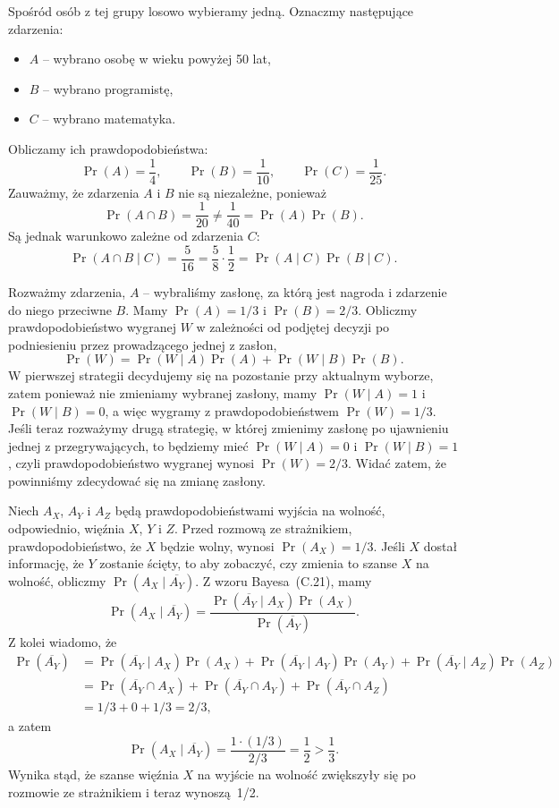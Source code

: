 Spośród osób z tej grupy losowo wybieramy jedną. Oznaczmy następujące zdarzenia:
\begin{itemize}
	\item $A$ -- wybrano osobę w wieku powyżej 50 lat,
	\item $B$ -- wybrano programistę,
	\item $C$ -- wybrano matematyka.
\end{itemize}
Obliczamy ich prawdopodobieństwa:
\[
	\Pr(A) = \frac{1}{4}, \qquad \Pr(B) = \frac{1}{10}, \qquad \Pr(C) = \frac{1}{25}.
\]
Zauważmy, że zdarzenia $A$ i $B$ nie są niezależne, ponieważ
\[
	\Pr(A\cap B) = \frac{1}{20} \ne \frac{1}{40} = \Pr(A)\Pr(B).
\]
Są jednak warunkowo zależne od zdarzenia $C$:
\[
	\Pr(A\cap B\mid C) = \frac{5}{16} = \frac{5}{8}\cdot\frac{1}{2} = \Pr(A\mid C)\Pr(B\mid C).
\]

\exercise{} %
Rozważmy zdarzenia, $A$ -- wybraliśmy zasłonę, za którą jest nagroda i zdarzenie do niego przeciwne $B$. Mamy $\Pr(A)=1/3$ i $\Pr(B)=2/3$. Obliczmy prawdopodobieństwo wygranej $W$ w zależności od podjętej decyzji po podniesieniu przez prowadzącego jednej z zasłon,
\[
	\Pr(W) = \Pr(W\mid A)\Pr(A)+\Pr(W\mid B)\Pr(B).
\]
W pierwszej strategii decydujemy się na pozostanie przy aktualnym wyborze, zatem ponieważ nie zmieniamy wybranej zasłony, mamy $\Pr(W\mid A)=1$ i~$\Pr(W\mid B)=0$, a więc wygramy z prawdopodobieństwem $\Pr(W)=1/3$. Jeśli teraz rozważymy drugą strategię, w której zmienimy zasłonę po ujawnieniu jednej z przegrywających, to będziemy mieć $\Pr(W\mid A)=0$ i $\Pr(W\mid B)=1$, czyli prawdopodobieństwo wygranej wynosi $\Pr(W)=2/3$. Widać zatem, że powinniśmy zdecydować się na zmianę zasłony.

\exercise{} %
Niech $A_X$, $A_Y$ i $A_Z$ będą prawdopodobieństwami wyjścia na wolność, odpowiednio, więźnia $X$, $Y$ i $Z$. Przed rozmową ze strażnikiem, prawdopodobieństwo, że $X$ będzie wolny, wynosi $\Pr(A_X)=1/3$. Jeśli $X$ dostał informację, że $Y$ zostanie ścięty, to aby zobaczyć, czy zmienia to szanse $X$ na wolność, obliczmy $\Pr(A_X\mid\overline{A_Y})$. Z wzoru Bayesa~(C.21), mamy
\[
	\Pr(A_X\mid\overline{A_Y}) = \frac{\Pr(\overline{A_Y}\mid A_X)\Pr(A_X)}{\Pr(\overline{A_Y})}.
\]
Z kolei wiadomo, że
\begin{align*}
	\Pr(\overline{A_Y}) &= \Pr(\overline{A_Y}\mid A_X)\Pr(A_X)+\Pr(\overline{A_Y}\mid A_Y)\Pr(A_Y)+\Pr(\overline{A_Y}\mid A_Z)\Pr(A_Z) \\
	&= \Pr(\overline{A_Y}\cap A_X)+\Pr(\overline{A_Y}\cap A_Y)+\Pr(\overline{A_Y}\cap A_Z) \\
	&= 1/3+0+1/3 = 2/3,
\end{align*}
a zatem
\[
	\Pr(A_X\mid\overline{A_Y}) = \frac{1\cdot (1/3)}{2/3} = \frac{1}{2}>\frac{1}{3}.
\]
Wynika stąd, że szanse więźnia $X$ na wyjście na wolność zwiększyły się po rozmowie ze strażnikiem i teraz wynoszą~1/2.

